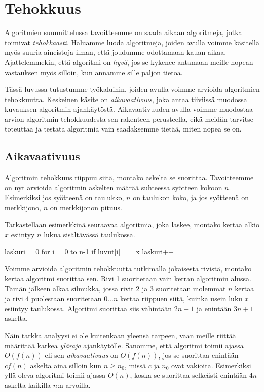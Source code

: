 \chapter{Tehokkuus}

Algoritmien suunnittelussa tavoitteemme on saada aikaan
algoritmeja, jotka toimivat \emph{tehokkaasti}.
Haluamme luoda algoritmeja, joiden avulla voimme
käsitellä myös suuria aineistoja ilman, että joudumme
odottamaan kauan aikaa.
Ajattelemmekin, että algoritmi on \emph{hyvä},
jos se kykenee antamaan meille nopean vastauksen myös silloin,
kun annamme sille paljon tietoa.

Tässä luvussa tutustumme työkaluihin, joiden avulla
voimme arvioida algoritmien tehokkuutta.
Keskeinen käsite on \emph{aikavaativuus}, joka antaa
tiiviissä muodossa kuvauksen algoritmin ajankäytöstä.
Aikavaativuuden avulla voimme muodostaa arvion
algoritmin tehokkuudesta sen rakenteen perusteella,
eikä meidän tarvitse toteuttaa ja testata algoritmia
vain saadaksemme tietää, miten nopea se on.

\section{Aikavaativuus}


Algoritmin tehokkuus riippuu siitä, montako askelta se suorittaa.
Tavoitteemme on nyt arvioida algoritmin askelten määrää
suhteessa syötteen kokoon $n$.
Esimerkiksi jos syötteenä on taulukko,
$n$ on taulukon koko,
ja jos syötteenä on merkkijono,
$n$ on merkkijonon pituus.

Tarkastellaan esimerkkinä seuraavaa algoritmia,
joka laskee, montako kertaa alkio $x$ esiintyy
$n$ lukua sisältävässä taulukossa.

\begin{code}[numbers=left]
laskuri = 0
for i = 0 to n-1
    if luvut[i] == x
        laskuri++
\end{code}

Voimme arvioida algoritmin tehokkuutta tutkimalla
jokaisesta rivistä, montako kertaa algoritmi suorittaa sen.
Rivi 1 suoritetaan vain kerran algoritmin alussa.
Tämän jälkeen alkaa silmukka, jossa
rivit 2 ja 3 suoritetaan molemmat $n$ kertaa
ja rivi 4 puolestaan suoritetaan $0 \dots n$
kertaa riippuen siitä, kuinka usein
luku $x$ esiintyy taulukossa.
Algoritmi suorittaa siis vähintään $2n+1$ ja enintään $3n+1$
askelta.


Näin tarkka analyysi ei ole kuitenkaan yleensä tarpeen,
vaan meille riittää määrittää karkea \emph{yläraja} ajankäytölle.
Sanomme, että algoritmi toimii ajassa $O(f(n))$ eli sen
\emph{aikavaativuus} on $O(f(n))$, jos se suorittaa
enintään $c f(n)$ askelta aina silloin kun $n \ge n_0$,
missä $c$ ja $n_0$ ovat vakioita.
Esimerkiksi yllä oleva algoritmi toimii ajassa $O(n)$,
koska se suorittaa selkeästi enintään $4n$ askelta
kaikilla $n$:n arvoilla.

